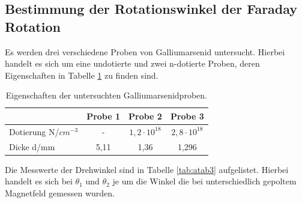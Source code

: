 \subsection{Bestimmung der Rotationswinkel der Faraday Rotation}
Es werden drei verschiedene Proben von Galliumarsenid untersucht. Hierbei handelt es sich um eine undotierte und zwei n-dotierte Proben, deren Eigenschaften in Tabelle \ref{tab:atab2} zu finden sind.

\FloatBarrier
\begin{table}[h]
    \centering
    \caption{Eigenschaften der untersuchten Galliumarsenidproben.}
    \label{tab:atab2}
    \begin{tabular}{l c c c}
        \toprule
        {} & {Probe 1} & {Probe 2} & {Probe 3} \\
        \midrule
        Dotierung N/$cm^{-3}$ & - & $1,2 \cdot 10^{18}$ & $2,8 \cdot 10^{18}$ \\
        Dicke d/mm & 5,11 & 1,36 & 1,296 \\
        \bottomrule
    \end{tabular}
\end{table}
\FloatBarrier
\noindent


Die Messwerte der Drehwinkel sind in Tabelle \ref{tab:atab3} aufgelistet. Hierbei handelt es sich bei $\theta_1$ und $\theta_2$ je um die Winkel die bei unterschiedlich gepoltem Magnetfeld gemessen wurden.

